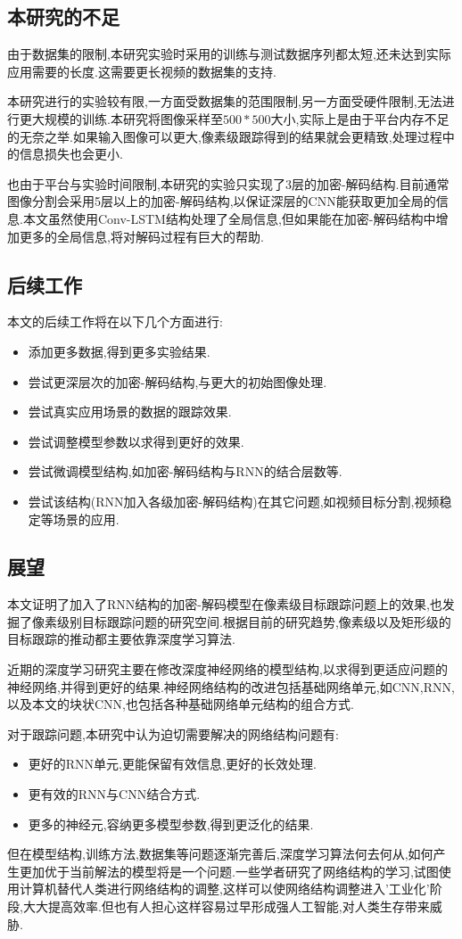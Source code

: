 \subsection{本研究的不足}
由于数据集的限制,本研究实验时采用的训练与测试数据序列都太短,还未达到实际应用需要的长度.这需要更长视频的数据集的支持.
\par
本研究进行的实验较有限,一方面受数据集的范围限制,另一方面受硬件限制,无法进行更大规模的训练.本研究将图像采样至$500*500$大小,实际上是由于平台内存不足的无奈之举.如果输入图像可以更大,像素级跟踪得到的结果就会更精致,处理过程中的信息损失也会更小.
\par
也由于平台与实验时间限制,本研究的实验只实现了3层的加密-解码结构.目前通常图像分割会采用5层以上的加密-解码结构,以保证深层的CNN能获取更加全局的信息.本文虽然使用Conv-LSTM结构处理了全局信息,但如果能在加密-解码结构中增加更多的全局信息,将对解码过程有巨大的帮助.
\subsection{后续工作}
本文的后续工作将在以下几个方面进行:
\begin{itemize}
    \item 添加更多数据,得到更多实验结果.
    \item 尝试更深层次的加密-解码结构,与更大的初始图像处理.
    \item 尝试真实应用场景的数据的跟踪效果.
    \item 尝试调整模型参数以求得到更好的效果.
    \item 尝试微调模型结构,如加密-解码结构与RNN的结合层数等.
    \item 尝试该结构(RNN加入各级加密-解码结构)在其它问题,如视频目标分割,视频稳定\supercite{benchme}等场景的应用.
\end{itemize}

\subsection{展望}
本文证明了加入了RNN结构的加密-解码模型在像素级目标跟踪问题上的效果,也发掘了像素级别目标跟踪问题的研究空间.根据目前的研究趋势,像素级以及矩形级的目标跟踪的推动都主要依靠深度学习算法.
\par
近期的深度学习研究主要在修改深度神经网络的模型结构,以求得到更适应问题的神经网络,并得到更好的结果.神经网络结构的改进包括基础网络单元,如CNN,RNN,以及本文的块状CNN,也包括各种基础网络单元结构的组合方式.
\par
对于跟踪问题,本研究中认为迫切需要解决的网络结构问题有:
\begin{itemize}
    \item 更好的RNN单元,更能保留有效信息,更好的长效处理.
    \item 更有效的RNN与CNN结合方式.
    \item 更多的神经元,容纳更多模型参数,得到更泛化的结果.
\end{itemize}
\par
但在模型结构,训练方法,数据集等问题逐渐完善后,深度学习算法何去何从,如何产生更加优于当前解法的模型将是一个问题.一些学者研究了网络结构的学习\supercite{cortes2017adanet},试图使用计算机替代人类进行网络结构的调整,这样可以使网络结构调整进入'工业化'阶段,大大提高效率.但也有人担心这样容易过早形成强人工智能\supercite{kurzweil2005singularity},对人类生存带来威胁.

